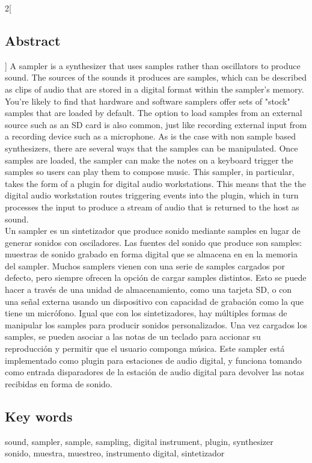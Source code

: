 \documentclass[12pt , a4paper]{article}
\begin{document}
	\begin{multicols}{2}[\subsection{Abstract}]
	A sampler is a synthesizer that uses samples rather than oscillators to produce sound.  The sources of the sounds it produces are samples, which can be described as clips of audio that are stored in a digital format within the sampler's memory. You're likely to find that hardware and software samplers offer sets of "stock" samples that are loaded by default. The option to load samples from an external source such as an SD card is also common, just like recording external input from a recording device such as a microphone. As is the case with non sample based synthesizers, there are several ways that the samples can be manipulated. Once samples are loaded, the sampler can make the notes on a keyboard trigger the samples so users can play them to compose music. This sampler, in particular, takes the form of a plugin for digital audio workstations. This means that the the digital audio workstation routes triggering events into the plugin, which in turn processes the input to produce a stream of audio that is returned to the host as sound.\\


	Un sampler es un sintetizador que produce sonido mediante samples en lugar de generar sonidos con osciladores. Las fuentes del sonido que produce son samples: muestras de sonido grabado en forma digital que se almacena en en la memoria del sampler. Muchos samplers vienen con una serie de samples cargados por defecto, pero siempre ofrecen la opción de cargar samples distintos. Esto se puede hacer a través de una unidad de almacenamiento, como una tarjeta SD, o con una señal externa usando un dispositivo con capacidad de grabación como la que tiene un micrófono. Igual que con los sintetizadores, hay múltiples formas de manipular los samples para producir sonidos personalizados. Una vez cargados los samples, se pueden asociar a las notas de un teclado para accionar su reproducción y permitir que el usuario componga música. Este sampler está implementado como plugin para estaciones de audio digital, y funciona tomando como entrada disparadores de la estación de audio digital para devolver las notas recibidas en forma de sonido. 
	\end{multicols}

	\subsection{Key words}
		sound, sampler, sample, sampling, digital instrument, plugin, synthesizer\\
		sonido, muestra, muestreo, instrumento digital, sintetizador
\end{document}
